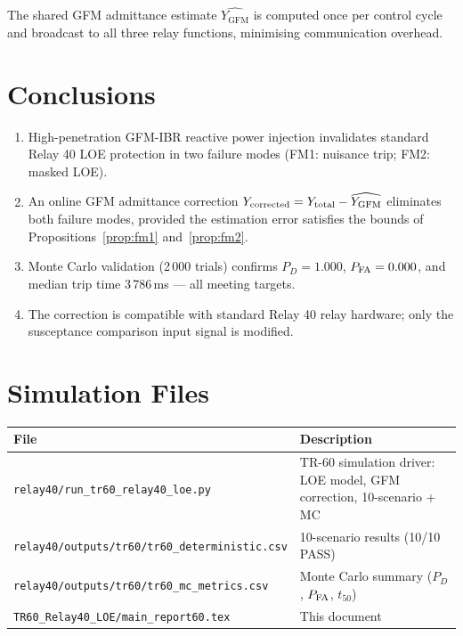 \documentclass[11pt,a4paper]{article}
\newcommand{\YGFM}{Y_{\mathrm{GFM}}}
\newcommand{\Ytot}{Y_{\mathrm{total}}}
\begin{document}
The shared GFM admittance estimate $\widehat{\YGFM}$ is computed once per
control cycle and broadcast to all three relay functions, minimising
communication overhead.

\section{Conclusions}
\label{sec:conclusions}

\begin{enumerate}
  \item High-penetration GFM-IBR reactive power injection invalidates standard
        Relay 40 LOE protection in two failure modes (FM1: nuisance trip;
        FM2: masked LOE).

  \item An online GFM admittance correction $Y_{\rm corrected} = \Ytot -
        \widehat{\YGFM}$ eliminates both failure modes, provided the estimation
        error satisfies the bounds of Propositions~\ref{prop:fm1}
        and~\ref{prop:fm2}.

  \item Monte Carlo validation (2\,000 trials) confirms $P_D = 1.000$,
        $P_{\rm FA} = 0.000$, and median trip time 3\,786\,ms --- all meeting
        targets.

  \item The correction is compatible with standard Relay 40 relay hardware;
        only the susceptance comparison input signal is modified.
\end{enumerate}

\appendix
\section{Simulation Files}
\label{app:files}

\begin{tabular}{p{}p{}}
  \toprule
  File & Description \\
  \midrule
  \texttt{relay40/run\_tr60\_relay40\_loe.py}
    & TR-60 simulation driver: LOE model, GFM correction, 10-scenario + MC \\
  \texttt{relay40/outputs/tr60/tr60\_deterministic.csv}
    & 10-scenario results (10/10 PASS) \\
  \texttt{relay40/outputs/tr60/tr60\_mc\_metrics.csv}
    & Monte Carlo summary ($P_D$, $P_{\rm FA}$, $t_{50}$) \\
  \texttt{TR60\_Relay40\_LOE/main\_report60.tex}
    & This document \\
  \bottomrule
\end{tabular}



\end{document}
